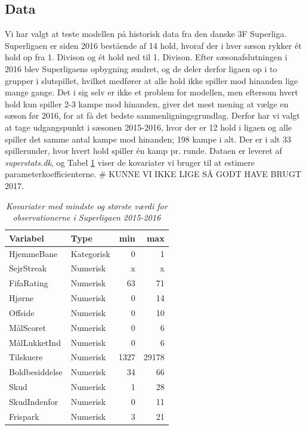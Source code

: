 \documentclass[11pt,a4paper]{article}
\begin{document}
\subsection{Data}
Vi har valgt at teste modellen på historisk data fra den danske 3F Superliga. Superligaen er siden 2016 bestående af 14 hold, hvoraf der i hver sæson rykker ét hold op fra 1. Divison og ét hold ned til 1. Divison. Efter sæsonafslutningen i 2016 blev Superligaens opbygning ændret, og de deler derfor ligaen op i to grupper i slutspillet, hvilket medfører at alle hold ikke spiller mod hinanden lige mange gange. Det i sig selv er ikke et problem for modellen, men eftersom hvert hold kun spiller 2-3 kampe mod hinanden, giver det mest mening at vælge en sæson før 2016, for at få det bedste sammenligningsgrundlag. Derfor har vi valgt at tage udgangspunkt i sæsonen 2015-2016, hvor der er 12 hold i ligaen og alle spiller det samme antal kampe mod hinanden; 198 kampe i alt. Der er i alt 33 spillerunder, hvor hvert hold spiller én kamp pr. runde. Dataen er leveret af \textit{superstats.dk}, og Tabel \ref{tab:Kovariater} viser de kovariater vi bruger til at estimere parameterkoefficienterne. \# KUNNE VI IKKE LIGE SÅ GODT HAVE BRUGT 2017.
\begin{table}[ht]
\centering
\begin{adjustbox}{max width=\textwidth}
\begin{tabular}{|l|lrr|}
  \hline
Variabel & Type & min & max \\ 
  \hline
HjemmeBane & Kategorisk & 0 & 1\\
SejrStreak & Numerisk & x & x\\
FifaRating & Numerisk & 63 & 71\\
Hjørne & Numerisk & 0 & 14\\
Offside & Numerisk & 0 & 10\\
MålScoret & Numerisk & 0 & 6\\
MålLukketInd & Numerisk & 0 & 6\\
Tilskuere & Numerisk & 1327 & 29178\\
Boldbesiddelse & Numerisk & 34 & 66\\
Skud & Numerisk & 1 & 28\\
SkudIndenfor & Numerisk & 0 & 11\\
Frispark & Numerisk & 3 & 21 \\
   \hline
\end{tabular}
\end{adjustbox}
\caption{\label{tab:Kovariater}\textit{Kovariater med mindste og største værdi for observationerne i Superligaen 2015-2016}}
\end{table}
\end{document}
